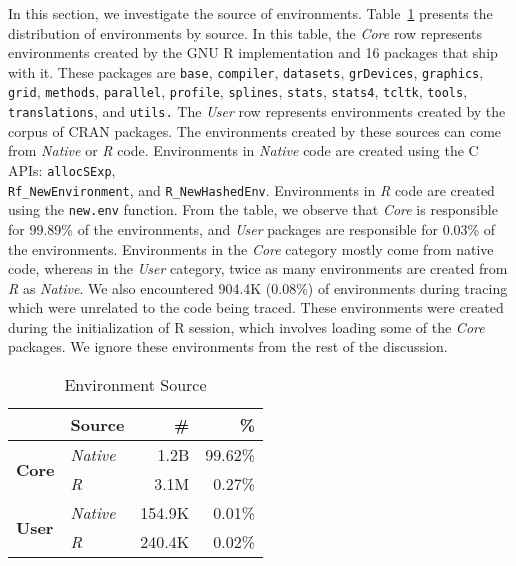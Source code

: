 \documentclass[10pt,review,sigplan,authorversion=true]{acmart}
\newcommand{\code}[1]{\lstinline |#1|\xspace}
\newcommand{\newEnv}{\code{new.env}}
\begin{document}
In this section, we investigate the source of environments.
Table~\ref{table:env_source} presents the distribution of environments by
source. In this table, the \emph{Core} row represents environments created by
the GNU R implementation and 16 packages that ship with it. These packages are
\code{base}, \code{compiler}, \code{datasets}, \code{grDevices},
\code{graphics}, \code{grid}, \code{methods}, \code{parallel}, \code{profile},
\code{splines}, \code{stats}, \code{stats4}, \code{tcltk}, \code{tools},
\code{translations}, and \code{utils.} The \emph{User} row represents
environments created by the corpus of CRAN packages. The environments created by
these sources can come from \emph{Native} or \emph{R} code. Environments in
\emph{Native} code are created using the C APIs: \code{allocSExp},
\\\code{Rf_NewEnvironment}, and \code{R_NewHashedEnv}. Environments in \emph{R}
code are created using the \newEnv function. From the table, we observe that
\emph{Core} is responsible for 99.89\% of the environments, and \emph{User}
packages are responsible for 0.03\% of the environments. Environments in the
\emph{Core} category mostly come from native code, whereas in the \emph{User}
category, twice as many environments are created from \emph{R} as \emph{Native}.
We also encountered 904.4K (0.08\%) of environments during tracing which were
unrelated to the code being traced. These environments were created during the
initialization of R session, which involves loading some of the \emph{Core}
packages. We ignore these environments from the rest of the discussion.

\begin{table}[!h]
  \small
  \centering
  \caption{Environment Source}\label{table:env_source}
  \vspace{-3mm}
  \begin{tabular}{llrr}
    \toprule
    &\textbf{Source}&\textbf{\#}&\textbf{\%}\\
    \midrule
    \multirow{2}{*}{\textbf{Core}}  & \multicolumn{1}{l}{\emph{Native}} & \multicolumn{1}{r}{1.2B} & \multicolumn{1}{r}{99.62\%}\\
                                    & \multicolumn{1}{l}{\emph{R}}      & \multicolumn{1}{r}{3.1M} & \multicolumn{1}{r}{0.27\%}\\
    \midrule
    \multirow{2}{*}{\textbf{User}}  & \multicolumn{1}{l}{\emph{Native}} & \multicolumn{1}{r}{154.9K} & \multicolumn{1}{r}{0.01\%}\\
                                    & \multicolumn{1}{l}{\emph{R}}      & \multicolumn{1}{r}{240.4K} & \multicolumn{1}{r}{0.02\%}\\
    \bottomrule
  \end{tabular}
\end{table}
\end{document}
